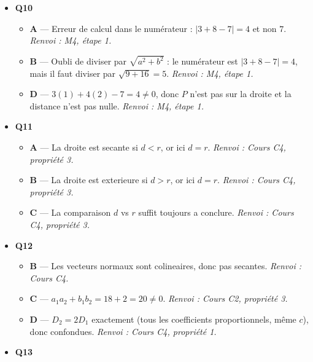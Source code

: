 \begin{itemize}
  \begin{itemize}
    \item \textbf{A} — Erreur de signe sur le centre : c'est $(-A/2, -B/2) = (1, -2)$. \emph{Renvoi : M3, piège 1.}
    \item \textbf{C} — Le rayon est $\sqrt{1 + 4 + 4} = 3$, pas $9$. \emph{Renvoi : M3, piège 2.}
    \item \textbf{D} — $r^2 = 1 + 4 + 4 = 9 > 0$, c'est bien un cercle. \emph{Renvoi : Cours C3.}
  \end{itemize}
  \item \textbf{Q10}
  \begin{itemize}
    \item \textbf{A} — Erreur de calcul dans le numérateur : $|3+8-7|=4$ et non $7$. \emph{Renvoi : M4, étape 1.}
    \item \textbf{B} — Oubli de diviser par $\sqrt{a^2+b^2}$ : le numérateur est $|3+8-7|=4$, mais il faut diviser par $\sqrt{9+16}=5$. \emph{Renvoi : M4, étape 1.}
    \item \textbf{D} — $3(1)+4(2)-7 = 4 \neq 0$, donc $P$ n'est pas sur la droite et la distance n'est pas nulle. \emph{Renvoi : M4, étape 1.}
  \end{itemize}
  \item \textbf{Q11}
  \begin{itemize}
    \item \textbf{A} — La droite est secante si $d < r$, or ici $d = r$. \emph{Renvoi : Cours C4, propriété 3.}
    \item \textbf{B} — La droite est exterieure si $d > r$, or ici $d = r$. \emph{Renvoi : Cours C4, propriété 3.}
    \item \textbf{C} — La comparaison $d$ vs $r$ suffit toujours a conclure. \emph{Renvoi : Cours C4, propriété 3.}
  \end{itemize}
  \item \textbf{Q12}
  \begin{itemize}
    \item \textbf{B} — Les vecteurs normaux sont colineaires, donc pas secantes. \emph{Renvoi : Cours C4.}
    \item \textbf{C} — $a_1 a_2 + b_1 b_2 = 18 + 2 = 20 \neq 0$. \emph{Renvoi : Cours C2, propriété 3.}
    \item \textbf{D} — $D_2 = 2 D_1$ exactement (tous les coefficients proportionnels, même $c$), donc confondues. \emph{Renvoi : Cours C4, propriété 1.}
  \end{itemize}
  \item \textbf{Q13}

\end{itemize}
